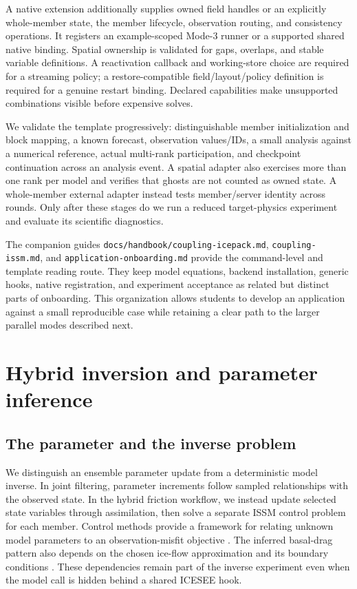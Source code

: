 \documentclass[11pt,a4paper]{article}
\newcommand{\code}[1]{\nolinkurl{#1}}
\begin{document}
A native extension additionally supplies owned field handles or an explicitly whole-member state, the member lifecycle, observation routing, and consistency operations. It registers an example-scoped Mode-3 runner or a supported shared native binding. Spatial ownership is validated for gaps, overlaps, and stable variable definitions. A reactivation callback and working-store choice are required for a streaming policy; a restore-compatible field/layout/policy definition is required for a genuine restart binding. Declared capabilities make unsupported combinations visible before expensive solves.

We validate the template progressively: distinguishable member initialization and block mapping, a known forecast, observation values/IDs, a small analysis against a numerical reference, actual multi-rank participation, and checkpoint continuation across an analysis event. A spatial adapter also exercises more than one rank per model and verifies that ghosts are not counted as owned state. A whole-member external adapter instead tests member/server identity across rounds. Only after these stages do we run a reduced target-physics experiment and evaluate its scientific diagnostics.

The companion guides \code{docs/handbook/coupling-icepack.md}, \code{coupling-issm.md}, and \code{application-onboarding.md} provide the command-level and template reading route. They keep model equations, backend installation, generic hooks, native registration, and experiment acceptance as related but distinct parts of onboarding. This organization allows students to develop an application against a small reproducible case while retaining a clear path to the larger parallel modes described next.

\section{Hybrid inversion and parameter inference}\label{sec:inversion}
\subsection{The parameter and the inverse problem}
We distinguish an ensemble parameter update from a deterministic model inverse. In joint filtering, parameter increments follow sampled relationships with the observed state. In the hybrid friction workflow, we instead update selected state variables through assimilation, then solve a separate ISSM control problem for each member. Control methods provide a framework for relating unknown model parameters to an observation-misfit objective \citep{macayeal1993}. The inferred basal-drag pattern also depends on the chosen ice-flow approximation and its boundary conditions \citep{morlighem2010}. These dependencies remain part of the inverse experiment even when the model call is hidden behind a shared ICESEE hook.
\end{document}
